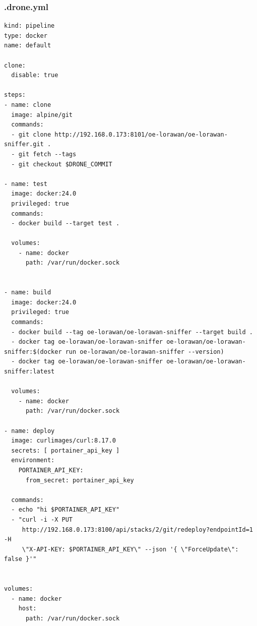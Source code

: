 \subsubsection*{.drone.yml}
\begin{lstlisting}
kind: pipeline
type: docker
name: default

clone:
  disable: true

steps:
- name: clone
  image: alpine/git
  commands:
  - git clone http://192.168.0.173:8101/oe-lorawan/oe-lorawan-sniffer.git .
  - git fetch --tags
  - git checkout $DRONE_COMMIT

- name: test
  image: docker:24.0
  privileged: true
  commands:
  - docker build --target test .

  volumes:
    - name: docker
      path: /var/run/docker.sock


- name: build
  image: docker:24.0
  privileged: true
  commands:
  - docker build --tag oe-lorawan/oe-lorawan-sniffer --target build .
  - docker tag oe-lorawan/oe-lorawan-sniffer oe-lorawan/oe-lorawan-sniffer:$(docker run oe-lorawan/oe-lorawan-sniffer --version)
  - docker tag oe-lorawan/oe-lorawan-sniffer oe-lorawan/oe-lorawan-sniffer:latest

  volumes:
    - name: docker
      path: /var/run/docker.sock

- name: deploy
  image: curlimages/curl:8.17.0
  secrets: [ portainer_api_key ]
  environment:
    PORTAINER_API_KEY:
      from_secret: portainer_api_key

  commands:
  - echo "hi $PORTAINER_API_KEY"
  - "curl -i -X PUT
     http://192.168.0.173:8100/api/stacks/2/git/redeploy?endpointId=1 -H
     \"X-API-KEY: $PORTAINER_API_KEY\" --json '{ \"ForceUpdate\": false }'"


volumes:
  - name: docker
    host:
      path: /var/run/docker.sock
\end{lstlisting}

